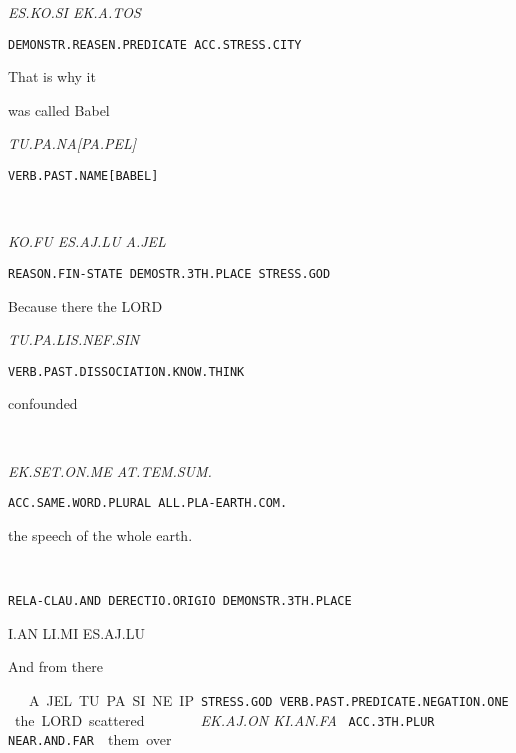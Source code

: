 {{\it ES.KO.SI				EK.A.TOS		 }

{\tt DEMONSTR.REASEN.PREDICATE	ACC.STRESS.CITY	 }

That is why 				it 			

\drie
 
was called Babel 

{\it TU.PA.NA[PA.PEL] }

{\tt VERB.PAST.NAME[BABEL] }

\tu\pa\na\cartouche{\pa\pel}

\drie


\ko\fu~\es\aj\lu~\Atlana\jel

{\it KO.FU			ES.AJ.LU			A.JEL }

{\tt REASON.FIN-STATE          DEMOSTR.3TH.PLACE		STRESS.GOD }

Because 		there 				the LORD  
\drie

\tu\pa\lis\nef\Atlansin

{\it TU.PA.LIS.NEF.SIN}                                              			 

{\tt VERB.PAST.DISSOCIATION.KNOW.THINK	 }

confounded 
\drie

 

\at\tem\Atlansum~\ek\set\on\me\period

{\it EK.SET.ON.ME      AT.TEM.SUM.			}


{\tt ACC.SAME.WORD.PLURAL 	ALL.PLA-EARTH.COM. }

the speech			 of the whole earth.

\drie

\Atlani\an~\li\mi~\es\aj\lu

{\tt RELA-CLAU.AND	DERECTIO.ORIGIO      DEMONSTR.3TH.PLACE }

I.AN			LI.MI			ES.AJ.LU			 

And 			from 			there 		
\drie

\Atlana\jel~\tu\pa\si\Atlanne\ip

A.JEL		TU.PA.SI.NE.IP    

{\tt STRESS.GOD	VERB.PAST.PREDICATE.NEGATION.ONE }

the LORD	scattered 
\drie

 
\ek\aj\on~\ki\an\fa

{\it EK.AJ.ON	KI.AN.FA               }

{\tt ACC.3TH.PLUR	NEAR.AND.FAR	 }

them 		over 		 
\drie
  
\ek\at\sem\tem

}
